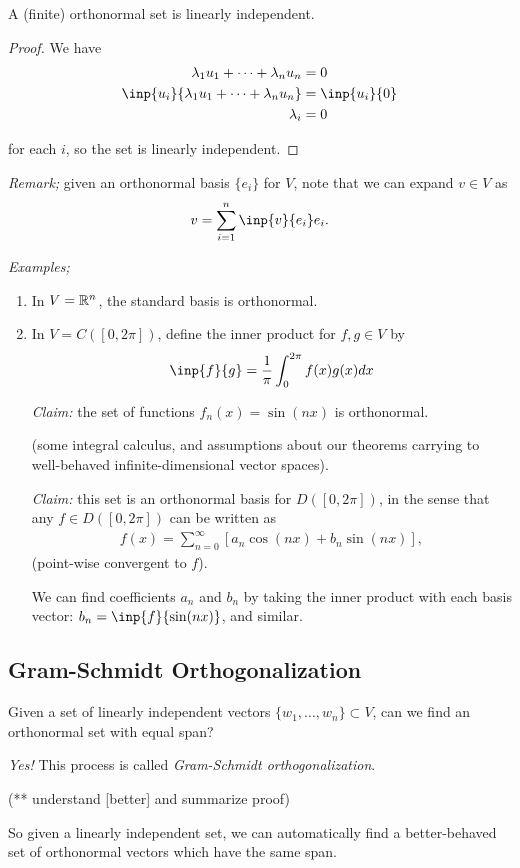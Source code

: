 \begin{lemma}
  A (finite) orthonormal set is linearly independent.
\end{lemma}
\begin{proof}
  We have
  \begin{align*}
    \lambda_1 u_1 + \cdots + \lambda_n u_n &= 0\\
    \inp{u_i}{\lambda_1 u_1 + \cdots + \lambda_n u_n} &= \inp{u_i}{0}\\
    \lambda_i &= 0
  \end{align*}

  for each $i$, so the set is linearly independent.
\end{proof}


\emph{Remark;} given an orthonormal basis $\{e_i\}$ for $V$, note that we can expand $v\in V$ as
\begin{align*}
  v = \sum_{i=1}^n \inp{v}{e_i} e_i.
\end{align*}


\emph{Examples;}
\begin{enumerate}[(1)]
  \item In $V=\mathbb{R}^n$, the standard basis is orthonormal.
  \item In $V=C([0,2\pi])$, define the inner product for $f,g\in V$ by
  \begin{align*}
    \inp{f}{g} = \frac{1}{\pi}\int_0^{2\pi} f(x)g(x)dx
  \end{align*}

  \emph{Claim:} the set of functions $f_n(x)=\sin(nx)$ is orthonormal.

  (some integral calculus, and assumptions about our theorems carrying to well-behaved infinite-dimensional vector spaces).

  \emph{Claim:} this set is an orthonormal basis for $D([0,2\pi])$, in the sense that any $f\in D([0,2\pi])$ can be written as
  \begin{align*}
    f(x) = \sum_{n=0}^\infty[a_n\cos(nx) + b_n\sin(nx)],
  \end{align*}
  (point-wise convergent to $f$).

  We can find coefficients $a_n$ and $b_n$ by taking the inner product with each basis vector: $b_n=\inp{f}{\sin(nx)}$, and similar.
\end{enumerate}


\subsection{Gram-Schmidt Orthogonalization}

\begin{question}
  Given a set of linearly independent vectors $\{w_1,\dots,w_n\}\subset V$, can we find an orthonormal set with equal span?
\end{question}
\begin{answer}
  \emph{Yes!} This process is called \emph{Gram-Schmidt orthogonalization}.
\end{answer}

(** understand  [better]  and summarize proof)

So given a linearly independent set, we can automatically find a better-behaved set  of orthonormal vectors which have the same span.
